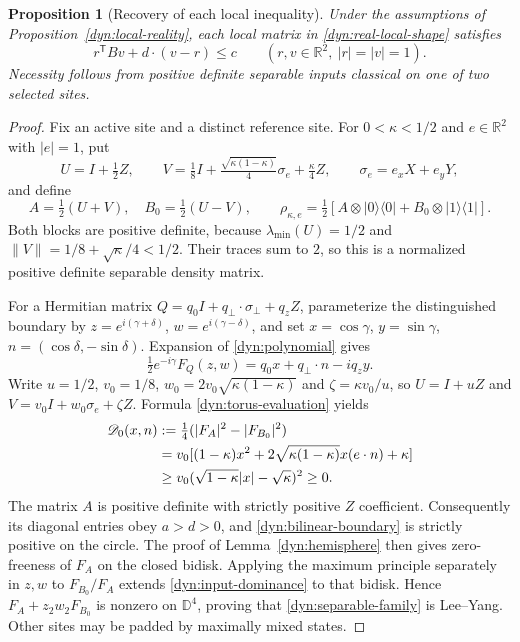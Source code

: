 \documentclass[reqno]{amsart}
\newtheorem{proposition}[theorem]{Proposition}
\theoremstyle{definition}
\theoremstyle{remark}
\newcommand{\R}{\mathbb R}
\newcommand{\D}{\mathbb D}
\begin{document}
\begin{proposition}[Recovery of each local inequality]\label{dyn:local-inequality}
Under the assumptions of Proposition~\ref{dyn:local-reality}, each local
matrix in \eqref{dyn:real-local-shape} satisfies
\begin{equation}\label{dyn:circle-criterion}
 r^{\mathsf T}Bv+d\cdot(v-r)\le c
 \qquad (r,v\in\R^2,\ |r|=|v|=1).
\end{equation}
Necessity follows from positive definite separable inputs classical on
one of two selected sites.
\end{proposition}

\begin{proof}
Fix an active site and a distinct reference site.  For $0<\kappa<1/2$
and $e\in\R^2$ with $|e|=1$, put
\[
 U=I+\tfrac12Z,\qquad
 V=\tfrac18I+\tfrac{\sqrt{\kappa(1-\kappa)}}4\sigma_e
        +\tfrac\kappa4Z,\qquad \sigma_e=e_xX+e_yY,
\]
and define
\begin{equation}\label{dyn:separable-family}
 A=\tfrac12(U+V),\quad B_0=\tfrac12(U-V),\qquad
 \rho_{\kappa,e}=\tfrac12
 [A\otimes|0\rangle\langle0|+B_0\otimes|1\rangle\langle1|].
\end{equation}
Both blocks are positive definite, because
$\lambda_{\min}(U)=1/2$ and
$\|V\|=1/8+\sqrt\kappa/4<1/2$.
Their traces sum to $2$, so this is a normalized positive definite
separable density matrix.

For a Hermitian matrix $Q=q_0I+q_\perp\cdot\sigma_\perp+q_zZ$, parameterize
the distinguished boundary by
$z=e^{i(\gamma+\delta)}$, $w=e^{i(\gamma-\delta)}$, and set
$x=\cos\gamma$, $y=\sin\gamma$, $n=(\cos\delta,-\sin\delta)$.
Expansion of \eqref{dyn:polynomial} gives
\begin{equation}\label{dyn:torus-evaluation}
 \tfrac12e^{-i\gamma}F_Q(z,w)=q_0x+q_\perp\cdot n-iq_zy.
\end{equation}
Write $u=1/2$, $v_0=1/8$,
$w_0=2v_0\sqrt{\kappa(1-\kappa)}$ and
$\zeta=\kappa v_0/u$, so $U=I+uZ$ and
$V=v_0I+w_0\sigma_e+\zeta Z$.  Formula
\eqref{dyn:torus-evaluation} yields
\begin{align}\label{dyn:input-dominance}
 \mathscr D_0(x,n)
 &:=\tfrac14(|F_A|^2-|F_{B_0}|^2)\notag\\
 &=v_0[(1-\kappa)x^2
 +2\sqrt{\kappa(1-\kappa)}x(e\cdot n)+\kappa]\notag\\
 &\ge v_0(\sqrt{1-\kappa}|x|-\sqrt\kappa)^2\ge0.
\end{align}
The matrix $A$ is positive definite with strictly positive $Z$ coefficient.
Consequently its diagonal entries obey $a>d>0$, and
\eqref{dyn:bilinear-boundary} is strictly positive on the circle.
The proof of Lemma~\ref{dyn:hemisphere} then gives zero-freeness of $F_A$
on the closed bidisk.  Applying the maximum principle separately in
$z,w$ to $F_{B_0}/F_A$ extends \eqref{dyn:input-dominance} to that bidisk.
Hence $F_A+z_2w_2F_{B_0}$ is nonzero on $\D^4$, proving that
\eqref{dyn:separable-family} is Lee--Yang.  Other sites may be padded by
maximally mixed states.


\end{proof}
\end{document}

